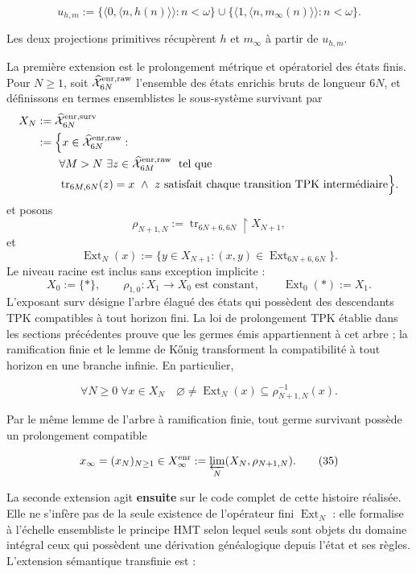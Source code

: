 \[
 u_{h,m}:=
 \{\langle0,\langle n,h(n)\rangle\rangle:n<\omega\}
 \cup
 \{\langle1,\langle n,m_\infty(n)\rangle\rangle:n<\omega\}.
\tag{33a}\label{hmtfg:base:eq:ch-codigo-conjunto}
\]

Les deux projections primitives récupèrent \(h\) et \(m_\infty\) à partir de \(u_{h,m}\).

La première extension est le prolongement métrique et opératoriel des états finis. Pour \(N\ge1\), soit \(\widehat{\mathcal X}^{\rm enr,raw}_{6N}\) l'ensemble des états enrichis bruts de longueur \(6N\), et définissons en termes ensemblistes le sous-système survivant par
\[
\begin{aligned}
 X_N
 &:=\widehat{\mathcal X}^{\rm enr,surv}_{6N}\\
 &:=\Bigl\{x\in\widehat{\mathcal X}^{\rm enr,raw}_{6N}:\\[-.2ex]
 &\qquad\forall M>N\ \exists z\in
   \widehat{\mathcal X}^{\rm enr,raw}_{6M}\;\text{ tel que}\\[-.2ex]
 &\qquad\operatorname{tr}_{6M,6N}(z)=x\ \wedge\
   z\text{ satisfait chaque transition TPK intermédiaire}\Bigr\}.
\end{aligned}
\]
et posons
\[
 \rho_{N+1,N}:=\operatorname{tr}_{6N+6,6N}\!\upharpoonright X_{N+1},
\]
et
\[
 \operatorname{Ext}_N(x):=
 \{y\in X_{N+1}:(x,y)\in
 \operatorname{Ext}_{6N+6,6N}\}.
\]
Le niveau racine est inclus sans exception implicite :
\[
 X_0:=\{\ast\},\qquad
 \rho_{1,0}:X_1\to X_0\text{ est constant},\qquad
 \operatorname{Ext}_0(\ast):=X_1.
\]
L’exposant \(\mathrm{surv}\) désigne
l’arbre élagué des états qui possèdent des descendants TPK compatibles à tout
horizon fini. La loi de prolongement TPK établie dans les sections
précédentes prouve que les germes
émis appartiennent à cet arbre ; la ramification finie et le lemme de Kőnig
transforment la compatibilité à tout horizon en une branche infinie. En
particulier,

\[
 \forall N\ge0\;\forall x\in X_N\quad
 \varnothing\ne\operatorname{Ext}_N(x)
 \subseteq\rho_{N+1,N}^{-1}(x).
\tag{34}\label{hmtfg:base:eq:ch-extension-no-vacia}
\]

Par le même lemme de l’arbre à ramification finie, tout germe survivant
possède un prolongement compatible

\[
 x_\infty=(x_N)_{N\ge1}\in
 X_\infty^{\rm enr}:=\varprojlim_N(X_N,\rho_{N+1,N}).
\tag{35}\label{hmtfg:base:eq:ch-limite-inverso}
\]

La seconde extension agit \textbf{ensuite} sur le code complet de cette
histoire réalisée.
Elle ne s’infère pas de la seule existence de l’opérateur fini
\(\operatorname{Ext}_N\) : elle formalise à l’échelle ensembliste le principe HMT selon
lequel seuls sont objets du domaine intégral ceux qui possèdent une dérivation
généalogique depuis l’état et ses règles. L’extension sémantique transfinie
est :

